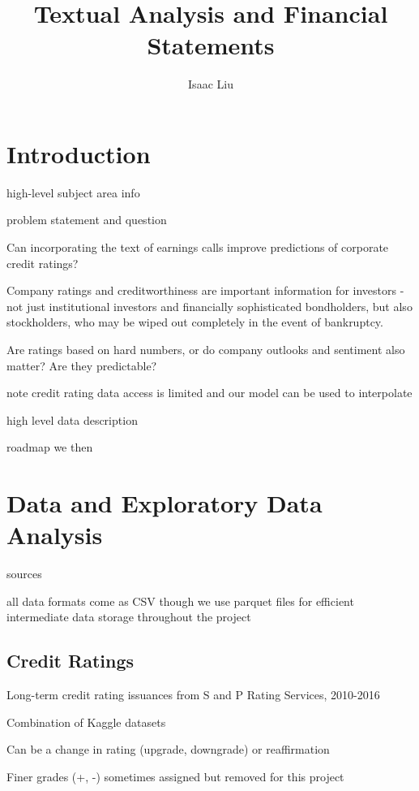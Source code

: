 \documentclass{article}
\title{Textual Analysis and Financial Statements}
\author{Isaac Liu}
\begin{document}
	\maketitle

    \section*{Introduction}

    high-level subject area info

    \citep{das_credit_2023}

    problem statement and question

    Can incorporating the text of earnings calls improve predictions of corporate credit ratings?

    Company ratings and creditworthiness are important information for investors - not just institutional investors and financially sophisticated bondholders, but also stockholders, who may be wiped out completely in the event of bankruptcy.

    Are ratings based on hard numbers, or do company outlooks and sentiment also matter? Are they predictable?

    note credit rating data access is limited and our model can be used to interpolate

    high level data description

    roadmap
    we then

    \section*{Data and Exploratory Data Analysis}

    sources

    all data formats come as CSV though we use parquet files for efficient intermediate data storage throughout the project

    \subsection*{Credit Ratings}

    Long-term credit rating issuances from S and P Rating Services, 2010-2016

    Combination of Kaggle datasets

    Can be a change in rating (upgrade, downgrade) or reaffirmation

    Finer grades (+, -) sometimes assigned but removed for this project
\end{document}
